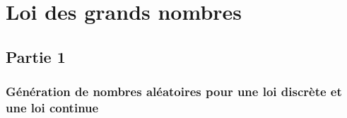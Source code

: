 \chapter{Loi des grands nombres}

\section{Partie 1}

\subsection{Génération de nombres aléatoires pour une loi discrète et une loi continue}

